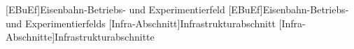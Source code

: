 \begin{acronym}
[EBuEf]{Eisenbahn-Betriebs- und Experimentierfeld}
[EBuEf]{Eisenbahn-Betriebs- und Experimentierfelds}
[Infra-Abschnitt]{Infrastrukturabschnitt}
[Infra-Abschnitte]{Infrastrukturabschnitte}
\end{acronym}